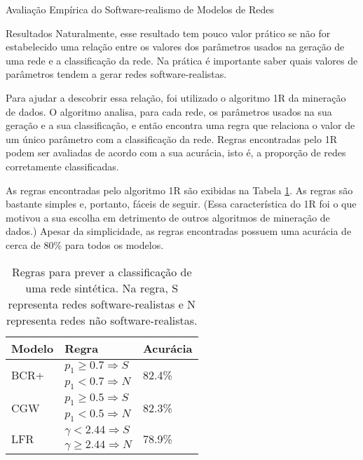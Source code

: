 \begin{section}{Avaliação Empírica do Software-realismo de Modelos de Redes}
\begin{subsection}{Resultados}
Naturalmente, esse resultado tem pouco valor prático se não for estabelecido uma relação entre os valores dos parâmetros usados na geração de uma rede e a classificação da rede. Na prática é importante saber quais valores de parâmetros tendem a gerar redes software-realistas.

Para ajudar a descobrir essa relação, foi utilizado o algoritmo 1R \cite{OneR} da mineração de dados. O algoritmo analisa, para cada rede, os parâmetros usados na sua geração e a sua classificação, e então encontra uma regra que relaciona o valor de um único parâmetro com a classificação da rede. Regras encontradas pelo 1R podem ser avaliadas de acordo com a sua acurácia, isto é, a proporção de redes corretamente classificadas.

As regras encontradas pelo algoritmo 1R são exibidas na Tabela \ref{tab:rules}. As regras são bastante simples e, portanto, fáceis de seguir. (Essa característica do 1R foi o que motivou a sua escolha em detrimento de outros algoritmos de mineração de dados.) Apesar da simplicidade, as regras encontradas possuem uma acurácia de cerca de 80\% para todos os modelos.

\begin{table}
\caption{Regras para prever a classificação de uma rede sintética. Na regra, S representa redes software-realistas e N representa redes não software-realistas.}
\centering
\begin{tabular}{|l|l|l|}
\hline
Modelo & Regra & Acurácia \\
\hline 
\hline
\multirow{2}{*}{BCR+}
     & $p_1 \ge 0.7 \Rightarrow S$ & \multirow{2}{*}{82.4\%}  \\ 
     & $p_1 < 0.7 \Rightarrow N$ & \\ 
\hline
\multirow{2}{*}{CGW}
     & $p_1 \ge 0.5 \Rightarrow S$ & \multirow{2}{*}{82.3\%} \\  
     & $p_1 < 0.5 \Rightarrow N$ & \\  
\hline
\multirow{2}{*}{LFR}   
     & $\gamma < 2.44 \Rightarrow S$ & \multirow{2}{*}{78.9\%} \\ 
     & $\gamma \ge 2.44 \Rightarrow N$ & \\ 
\hline
\end{tabular}
\label{tab:rules}
\end{table}

\end{subsection}

\end{section}


 
% 
% 
% 
% 
% 
% 
% 
% 
% 
